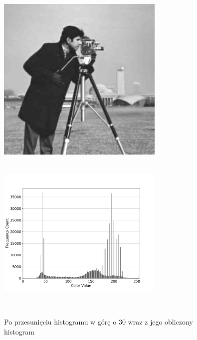 \documentclass[a4paper,12pt]{book}
\begin{document}
\begin{figure}[H]
	\caption{Po przesunięciu histogramu w górę o 30 wraz z jego obliczony histogram}
	\includegraphics[width=8cm, height=8cm]{5-2/move-histogram-image-photoman-30.png}
	\includegraphics[width=8cm, height=8cm]{5-2/move-histogram-photoman-30.png}
	

\end{figure}
\end{document}
